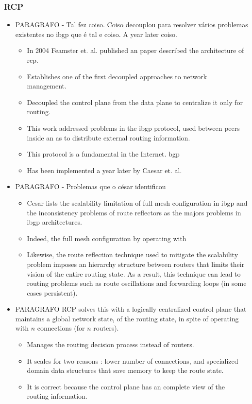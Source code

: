 \subsubsection{RCP}

\begin{itemize}
\item PARAGRAFO - Tal fez coiso. Coiso  decouplou para resolver vários problemas existentes no ibgp que é tal e coiso. A year later coiso. 
\begin{itemize}
  \item  In 2004 Feamster et. al.  \cite{Feamster:2004tg} published an paper described the architecture of \gls{rcp}.
  \item Establishes one of the first decoupled approaches to network management. 
  \item Decoupled the control plane from the data plane to centralize it only for routing. 
  \item This work addressed problems in the \gls{ibgp} protocol, used between peers inside an \gls{as} to distribute external routing information. 
  \item  This protocol is a fundamental in the Internet. \gls{bgp}  
  \item  Has been implemented a year later by Caesar et. al.  \cite{Caesar:2005wsa}
\end{itemize}

\item PARAGRAFO - Problemas que o césar identificou
  \begin{itemize}
  \item Cesar lists the scalability limitation of full mesh configuration in \gls{ibgp} and the inconsistency problems of route reflectors as the majors problems in \gls{ibgp} architectures. 
  \item  Indeed, the full mesh configuration by operating with %
  \item Likewise, the route reflection technique used to mitigate the scalability problem imposes an hierarchy structure between routers that limits their vision of the entire routing state. As a result, this technique can lead to routing problems such as route oscillations and forwarding loops (in some cases persistent).  
  \end{itemize}


\item PARAGRAFO RCP solves this with a logically centralized control plane that maintains a  global network state, of the routing state, in spite of operating  with $n$ connections (for $n$ routers).  
  \begin{itemize}
  \item  Manages the routing decision process instead of routers. 
  \item  It scales for two reasons : lower number of connections, and specialized domain data structures that save memory to keep the route state. 
  \item It is correct because the control plane has an complete view of the routing information. 
  \end{itemize}


\end{itemize}
